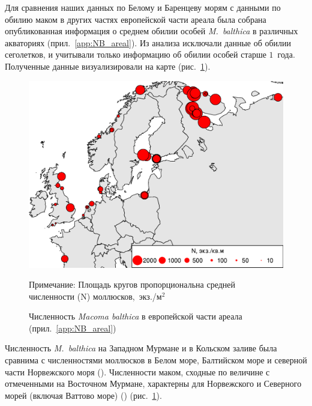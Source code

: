
Для сравнения наших данных по Белому и Баренцеву морям с данными по обилию маком в других частях европейской части ареала была собрана опубликованная информация о среднем обилии особей {\it M.~balthica} в различных акваториях (прил.~\ref{app:NB_areal}). 
Из анализа исключали данные об обилии сеголетков, и учитывали только информацию об обилии особей старше $1$~года.
Полученные данные визуализировали на карте (рис.~\ref{ris:macrodistribution}).
	\begin{figure}[p]
    \includegraphics[width=\textwidth]{../macrodistribution/Nmean_ru1.pdf}
    \caption{Численность {\it Macoma balthica} в европейской части ареала (прил.~\ref{app:NB_areal})}

{\footnotesize Примечание: Площадь кругов пропорциональна средней численности (N) моллюсков,~экз./м$^2$}
    \label{ris:macrodistribution}
	\end{figure}
Численность {\it M.~balthica} на Западном Мурмане и в Кольском заливе была сравнима с численностями моллюсков в Белом море, Балтийском море и северной части Норвежского моря (\cite{Semenova_1974, Aschan_1988, Maximovich_et_al_1991, Bonsdorff_et_al_1995, Bostrom_Bonsdorff_2000, Oug_2001, Laine_et_al_2003, Khaitov_et_al_2007, Varfolomeeva_Naumov_2013}).
Численности маком, сходные по величине с отмеченными на Восточном Мурмане, характерны для Норвежского и Северного морей (включая Ваттово море) (\cite{Brady_1943, Sneli_1968, Stromgren_et_al_1973, Beukema_1976, Jensen_Jensen_1985, Jensen_et_al_1985, Madsen_Jensen_1987, Beukema_1979, Zwarts_Wanink_1993, Reise_et_al_1994}) (рис.~\ref{ris:macrodistribution}).

